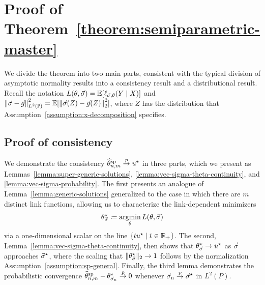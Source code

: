 \section{Proof of Theorem~\ref{theorem:semiparametric-master}}
\label{proof:semiparametric-master}

We divide the theorem into two main parts, consistent with the typical
division of asymptotic normality results into a consistency result and a
distributional result. Recall the notation $L(\theta,
\vec{\sigma}) = \mathbb{E}[\ell_{\vec{\sigma},\theta}(Y \mid X)]$
and
$\left\|{\vec{\sigma} - \vec{g}}\right\|_{L^2(\mathbb{P})}^2
= \mathbb{E}[\left\|{\vec{\sigma}(Z) - \vec{g}(Z)}\right\|_2^2]$,
where $Z$ has the distribution
that Assumption~\ref{assumption:x-decomposition} specifies.

\subsection{Proof of consistency}

We demonstrate the consistency $\widehat{\theta}^{\textup{sp}}_{n,m} \stackrel{p}{\rightarrow} u^\star$ in three parts, which we
present as Lemmas~\ref{lemma:super-generic-solutions},
\ref{lemma:vec-sigma-theta-continuity}, and
\ref{lemma:vec-sigma-probability}. The first presents an analogue of
Lemma~\ref{lemma:generic-solutions} generalized to the case in
which there are $m$ distinct link functions, allowing us to characterize
the link-dependent minimizers
\begin{equation*}
  \theta^\star_{\vec{\sigma}} \coloneqq \operatorname*{argmin}_\theta L(\theta, \vec{\sigma})
\end{equation*}
via a one-dimensional scalar on the line $\{t u^\star \mid t \in \mathbb{R}_+\}$.  The
second, Lemma~\ref{lemma:vec-sigma-theta-continuity}, then shows that
$\theta^\star_{\vec{\sigma}} \to u^\star$ as $\vec{\sigma}$ approaches
$\vec{\sigma}^\star$, where the scaling that
$\|{\theta^\star_{\vec{\sigma}}}\|_2 \to 1$ follows by the normalization
Assumption~\ref{assumption:sp-general}.
Finally, the third lemma
demonstrates the probabilistic convergence $\widehat{\theta}^{\textup{sp}}_{n,m} -
\theta^\star_{\vec{\sigma}_n} \stackrel{p}{\rightarrow} 0$ whenever $\vec{\sigma}_n \stackrel{p}{\rightarrow}
\vec{\sigma}^\star$ in $L^2(P)$.

